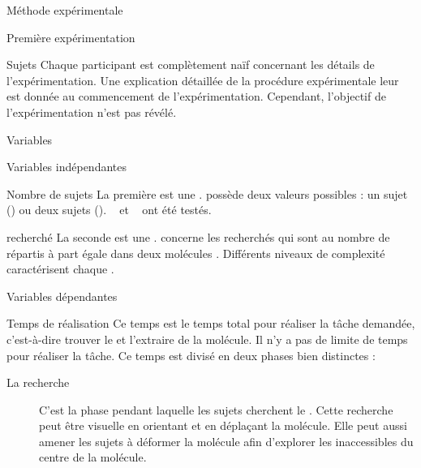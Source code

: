 \documentclass[myfrancais]{mythesis}
\begin{document}
\begin{mychapter}{Méthode expérimentale}
\begin{mysection}{Première expérimentation}
\begin{mysubsection}{Sujets}
				Chaque participant est complètement naïf concernant les détails de l'expérimentation.
				Une explication détaillée de la procédure expérimentale leur est donnée au commencement de l'expérimentation.
				Cependant, l'objectif de l'expérimentation n'est pas révélé.
			\end{mysubsection}
			\begin{mysubsection}{Variables}
				\begin{mysubsubsection}{Variables indépendantes}
					\begin{myparagraph}{ Nombre de sujets}
						La première  est une .
						 possède deux valeurs possibles : \og un sujet \fg (\mycf {}) ou \og deux sujets \fg (\mycf {}).
						~ et ~ ont été testés.
					\end{myparagraph}
					\begin{myparagraph}{  recherché}
						La seconde  est une .
						 concerne les  recherchés qui sont au nombre de  répartis à part égale dans deux molécules .
						Différents niveaux de complexité caractérisent chaque  .
					\end{myparagraph}
				\end{mysubsubsection}
				\begin{mysubsubsection}{Variables dépendantes}
					\begin{myparagraph}{ Temps de réalisation}
						Ce temps est le temps total pour réaliser la tâche demandée, c'est-à-dire trouver le  et l'extraire de la molécule.
						Il n'y a pas de limite de temps pour réaliser la tâche.
						Ce temps est divisé en deux phases bien distinctes :
						\begin{description}
							\item[La recherche] C'est la phase pendant laquelle les sujets cherchent le .
								Cette recherche peut être visuelle en orientant et en déplaçant la molécule.
								Elle peut aussi amener les sujets à déformer la molécule afin d'explorer les  inaccessibles du centre de la molécule.

\end{description}
\end{myparagraph}
\end{mysubsubsection}
\end{mysubsection}
\end{mysection}
\end{mychapter}
\end{document}
